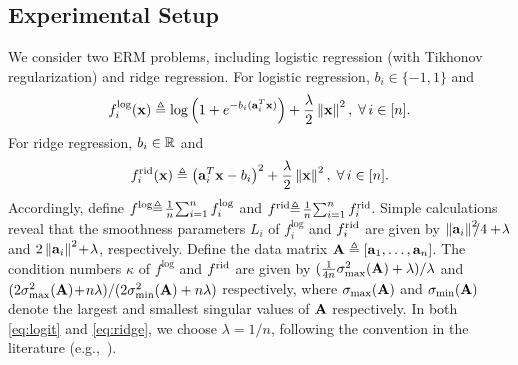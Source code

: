 \documentclass[10pt,twocolumn,journal]{IEEEtran}
\newcommand{\rid}{{\rm rid}}
\begin{document}
\subsection{Experimental Setup}\label{sec:setup}
We consider two ERM problems, including logistic regression (with Tikhonov regularization) and ridge regression. For logistic regression, $b_i\in\{-1,1\}$ and 
\begin{equation}
f_i^{\log}(\mathbf{x}) \triangleq \log\left(1+e^{-b_i(\mathbf{a}_i^T\mathbf{x})}\right)+\frac{\lambda}{2} \left\Vert\mathbf{x}\right\Vert^2, \;\forall\,i\in[n].  \label{eq:logit}
\end{equation}
For ridge regression, $b_i\in\mathbb{R}$ and
\begin{equation}
f_i^{\rid}(\bx) \defeq \left(\ba_i^T\bx-b_i\right)^2+\frac{\lambda}{2} \norm{\bx}^2, \;\forall\,i\in[n].  \label{eq:ridge}
\end{equation}
Accordingly, define $f^{\log}\!\!\triangleq \!\frac{1}{n}\!\sum_{i=1}^n f_i^{\log}$ and $f^{\rid}\!\!\defeq\! \frac{1}{n}\!\sum_{i=1}^n f_i^{\rid}$. 
Simple calculations reveal that the smoothness parameters $L_i$ of $f_i^{\log}$ and $f_i^{\rid}$ %
are given by $\left\Vert\mathbf{a}_i\right\Vert^2\!\!\!/4+\!\lambda$ and $2\left\Vert\mathbf{a}_i\right\Vert^2\!+\!\lambda$, respectively. Define the data matrix $\mathbf{A}\triangleq [\mathbf{a}_1,\ldots,\mathbf{a}_n]$. 
The condition numbers $\kappa$ of $f^{\log}$ and $f^{\rid}$ %
are given by $(\frac{1}{4n}\sigma_{\max}^2(\mathbf{A})+\lambda)/\lambda$ and $({2}\sigma_{\max}^2(\mathbf{A})\!+\!n\lambda)/({2}\sigma_{\min}^2(\mathbf{A})+n\lambda)$ respectively, where $\sigma_{\max}(\mathbf{A})$ and $\sigma_{\min}(\mathbf{A})$ denote the largest and smallest singular values of $\mathbf{A}$ respectively.  
In both \eqref{eq:logit} and \eqref{eq:ridge}, we choose $\lambda=1/n$, following the convention in the literature (e.g.,~\cite{Gower_16}). 
\end{document}
